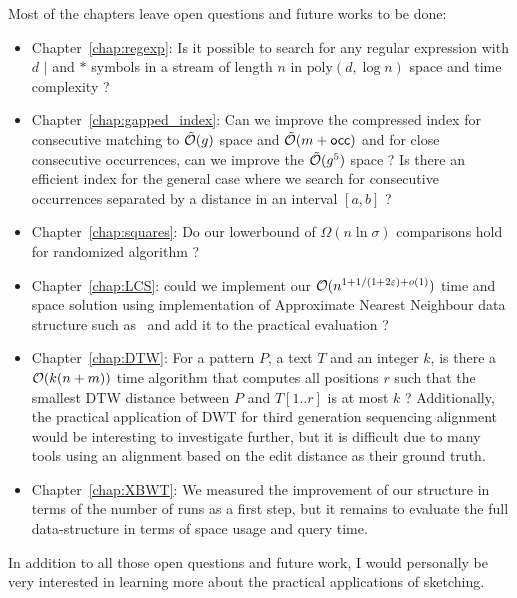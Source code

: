 %
Most of the chapters leave open questions and future works to be done:
\begin{itemize}
    \item Chapter~\ref{chap:regexp}: Is it possible to search for any regular expression with $d$ $|$ and $\ast$ symbols in a stream of length $n$ in $\mathrm{poly}(d,\log n)$ space and time complexity ?
    \item Chapter~\ref{chap:gapped_index}: Can we improve the compressed index for consecutive matching to $\tilde{\mathcal{O}}(g)$ space and $\tilde{\mathcal{O}}(m+\mathsf{occ})$ and for close consecutive occurrences, can we improve the $\tilde{\mathcal{O}}(g^5)$ space ? Is there an efficient index for the general case where we search for consecutive occurrences separated by a distance in an interval $[a,b]$ ?
    \item Chapter~\ref{chap:squares}: Do our lowerbound of $\Omega(n\ln \sigma)$ comparisons hold for randomized algorithm ?
    \item Chapter~\ref{chap:LCS}: could we implement our $\mathcal{O}(n^{1+ 1/(1+2\varepsilon) + o(1)})$ time and space solution using implementation of Approximate Nearest Neighbour data structure such as~\cite{} and add it to the practical evaluation ?
    \item Chapter~\ref{chap:DTW}: For a pattern $P$, a text $T$ and an integer $k$, is there a $\mathcal{O}(k(n+m))$ time algorithm that computes all positions $r$ such that the smallest DTW distance between $P$ and $T[1..r]$ is at most $k$ ? Additionally, the practical application of DWT for third generation sequencing alignment would be interesting to investigate further, but it is difficult due to many tools using an alignment based on the edit distance as their ground truth.    
    \item Chapter~\ref{chap:XBWT}: We measured the improvement of our structure in terms of the number of runs as a first step, but it remains to evaluate the full data-structure in terms of space usage and query time.
\end{itemize}
%
In addition to all those open questions and future work, I would personally be very interested in learning more about the practical applications of sketching.  
% 

